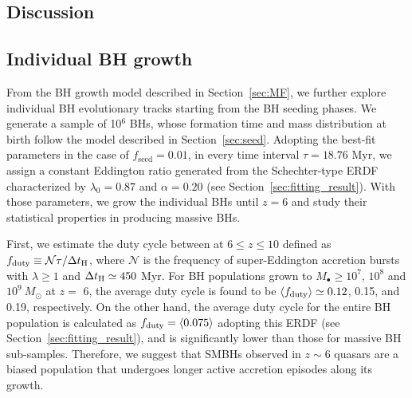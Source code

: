 \documentclass[twocolumn, twocolappendix]{aastex63}
\newcommand{\Msun}{M_\odot}
\newcommand{\tlife}{\tau}
\newcommand{\fseed}{f_\mathrm{seed}}
\begin{document}
\begin{CJK*}{UTF8}{gbsn}
\vspace{2mm}
\section{Discussion}\label{sec:discussion}
\vspace{2mm}
\subsection{Individual BH growth}\label{sec:evol}

From the BH growth model described in Section~\ref{sec:MF}, we further explore individual BH evolutionary tracks starting from the BH seeding phases.
We generate a sample of 10$^6$ BHs, whose formation time and mass distribution at birth follow the model described in Section~\ref{sec:seed}. 
Adopting the best-fit parameters in the case of $\fseed = 0.01$, in every time interval $\tlife=18.76$ Myr,
we assign a constant Eddington ratio generated from the Schechter-type ERDF characterized by $\lambda_0=0.87$ and $\alpha=0.20$ 
(see Section~\ref{sec:fitting_result}).
With those parameters, we grow the individual BHs until $z=6$ and study their statistical properties in producing massive BHs.


First, we estimate the duty cycle between at $6\leq z\leq 10$ defined as $f_{\rm duty} \equiv \mathcal{N}\tlife/\Delta t_{\rm H}$, 
where $\mathcal{N}$ is the frequency of super-Eddington accretion bursts with $\lambda \geq 1$ and $\Delta t_{\rm H}\simeq 450$ Myr.
For BH populations grown to $M_\bullet \geq10^7$, $10^8$ and $10^9~\Msun$ at $z=$ 6,
the average duty cycle is found to be $\langle f_{\rm duty}\rangle \simeq 0.12$, 0.15, and 0.19, respectively.
On the other hand, the average duty cycle for the entire BH population is calculated as $f_{\rm duty}= \langle 0.075\rangle $
adopting this ERDF (see Section~\ref{sec:fitting_result}), and is significantly lower than those for massive BH sub-samples.
Therefore, we suggest that SMBHs observed in $z\sim 6$ quasars are a biased population
that undergoes longer active accretion episodes along its growth.



\end{CJK*}
\end{document}
